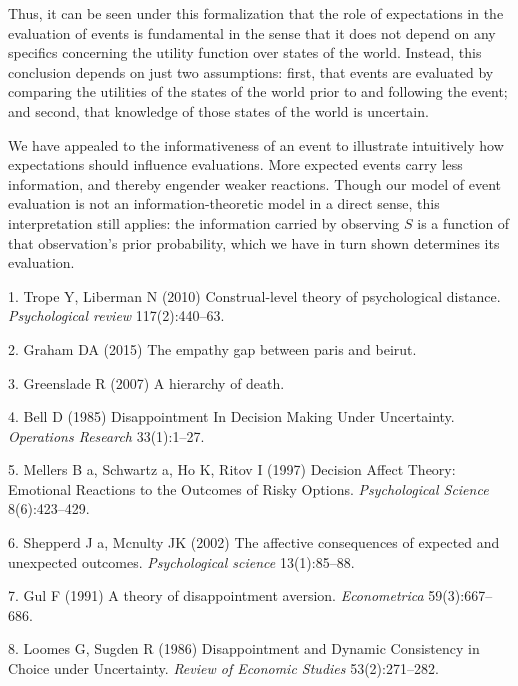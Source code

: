 \documentclass[9pt,twocolumn,twoside,]{pnas-new}
\begin{document}
{Thus, it can be seen under this formalization that the role of
expectations in the evaluation of events is fundamental in the sense
that it does not depend on any specifics concerning the utility function
over states of the world. Instead, this conclusion depends on just two
assumptions: first, that events are evaluated by comparing the utilities
of the states of the world prior to and following the event; and second,
that knowledge of those states of the world is uncertain.

We have appealed to the informativeness of an event to illustrate
intuitively how expectations should influence evaluations. More expected
events carry less information, and thereby engender weaker reactions.
Though our model of event evaluation is not an information-theoretic
model in a direct sense, this interpretation still applies: the
information carried by observing \(S\) is a function of that
observation's prior probability, which we have in turn shown determines
its evaluation.
}

\showmatmethods
\showacknow
\pnasbreak

\hypertarget{refs}{}
\hypertarget{ref-Trope2010}{}
1. Trope Y, Liberman N (2010) Construal-level theory of psychological
distance. \emph{Psychological review} 117(2):440--63.

\hypertarget{ref-Graham2015}{}
2. Graham DA (2015) The empathy gap between paris and beirut.

\hypertarget{ref-Greenslade2007}{}
3. Greenslade R (2007) A hierarchy of death.

\hypertarget{ref-Bell1985}{}
4. Bell D (1985) Disappointment In Decision Making Under Uncertainty.
\emph{Operations Research} 33(1):1--27.

\hypertarget{ref-Mellers1997}{}
5. Mellers B a, Schwartz a, Ho K, Ritov I (1997) Decision Affect Theory:
Emotional Reactions to the Outcomes of Risky Options.
\emph{Psychological Science} 8(6):423--429.

\hypertarget{ref-Shepperd2002}{}
6. Shepperd J a, Mcnulty JK (2002) The affective consequences of
expected and unexpected outcomes. \emph{Psychological science}
13(1):85--88.

\hypertarget{ref-Gul1991}{}
7. Gul F (1991) A theory of disappointment aversion. \emph{Econometrica}
59(3):667--686.

\hypertarget{ref-Loomes1986}{}
8. Loomes G, Sugden R (1986) Disappointment and Dynamic Consistency in
Choice under Uncertainty. \emph{Review of Economic Studies}
53(2):271--282.
\end{document}
